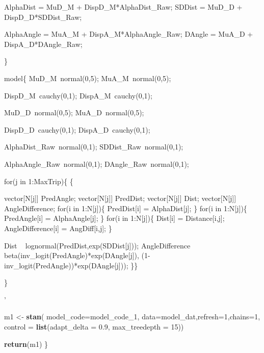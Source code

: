 \documentclass[]{article}
\newenvironment{Shaded}{\begin{snugshade}}{\end{snugshade}}
\newcommand{\KeywordTok}[1]{\textcolor[rgb]{0.13,0.29,0.53}{\textbf{#1}}}
\newcommand{\DataTypeTok}[1]{\textcolor[rgb]{0.13,0.29,0.53}{#1}}
\newcommand{\DecValTok}[1]{\textcolor[rgb]{0.00,0.00,0.81}{#1}}
\newcommand{\FloatTok}[1]{\textcolor[rgb]{0.00,0.00,0.81}{#1}}
\newcommand{\StringTok}[1]{\textcolor[rgb]{0.31,0.60,0.02}{#1}}
\newcommand{\NormalTok}[1]{#1}
\begin{document}
\begin{Shaded}
\begin{Highlighting}[]
{\StringTok{ AlphaDist = MuD_M + DispD_M*AlphaDist_Raw;}
\StringTok{ SDDist = MuD_D + DispD_D*SDDist_Raw;}

\StringTok{ AlphaAngle = MuA_M + DispA_M*AlphaAngle_Raw;}
\StringTok{ DAngle = MuA_D + DispA_D*DAngle_Raw;  }

\StringTok{\}}

\StringTok{model\{}
\StringTok{  MuD_M~normal(0,5); }
\StringTok{  MuA_M~normal(0,5); }

\StringTok{  DispD_M~cauchy(0,1); }
\StringTok{  DispA_M~cauchy(0,1); }

\StringTok{  MuD_D~normal(0,5); }
\StringTok{  MuA_D~normal(0,5); }

\StringTok{  DispD_D~cauchy(0,1); }
\StringTok{  DispA_D~cauchy(0,1); }

\StringTok{  AlphaDist_Raw~normal(0,1); }
\StringTok{  SDDist_Raw~normal(0,1); }

\StringTok{  AlphaAngle_Raw~normal(0,1); }
\StringTok{  DAngle_Raw~normal(0,1); }

\StringTok{for(j in 1:MaxTrip)\{}
\StringTok{\{}

\StringTok{ vector[N[j]] PredAngle;}
\StringTok{ vector[N[j]] PredDist;}
\StringTok{ vector[N[j]] Dist;}
\StringTok{ vector[N[j]] AngleDifference;}
\StringTok{  }
\StringTok{ for(i in 1:N[j])\{}
\StringTok{  PredDist[i] = AlphaDist[j]; }
\StringTok{  \} }
\StringTok{        }
\StringTok{ for(i in 1:N[j])\{}
\StringTok{  PredAngle[i] = AlphaAngle[j]; }
\StringTok{  \}       }
\StringTok{              }
\StringTok{ for(i in 1:N[j])\{            }
\StringTok{  Dist[i] = Distance[i,j];              }
\StringTok{  AngleDifference[i] = AngDiff[i,j];}
\StringTok{  \}}

\StringTok{ Dist ~ lognormal(PredDist,exp(SDDist[j]));}
\StringTok{ AngleDifference ~ beta(inv_logit(PredAngle)*exp(DAngle[j]), (1-inv_logit(PredAngle))*exp(DAngle[j]));}
\StringTok{ \}\}    }

\StringTok{\}}

\StringTok{'}

\NormalTok{ m1 <-}\StringTok{ }\KeywordTok{stan}\NormalTok{( }\DataTypeTok{model_code=}\NormalTok{model_code_}\DecValTok{1}\NormalTok{, }\DataTypeTok{data=}\NormalTok{model_dat,}\DataTypeTok{refresh=}\DecValTok{1}\NormalTok{,}\DataTypeTok{chains=}\DecValTok{1}\NormalTok{, }\DataTypeTok{control =} \KeywordTok{list}\NormalTok{(}\DataTypeTok{adapt_delta =} \FloatTok{0.9}\NormalTok{, }\DataTypeTok{max_treedepth =} \DecValTok{15}\NormalTok{))}

 \KeywordTok{return}\NormalTok{(m1)}
\NormalTok{\}}



}
\end{Highlighting}
\end{Shaded}
\end{document}
